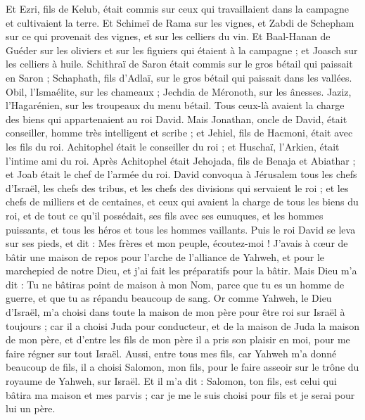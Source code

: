 \begin{multicols}{2}
Et Ezri, fils de Kelub, était commis sur ceux qui travaillaient dans la campagne et cultivaient la terre.
Et Schimeï de Rama sur les vignes, et Zabdi de Schepham sur ce qui provenait des vignes, et sur les celliers du vin.
Et Baal-Hanan de Guéder sur les oliviers et sur les figuiers qui étaient à la campagne ; et Joasch sur les celliers à huile.
Schithraï de Saron était commis sur le gros bétail qui paissait en Saron ; Schaphath, fils d'Adlaï, sur le gros bétail qui paissait dans les vallées.
Obil, l'Ismaélite, sur les chameaux ; Jechdia de Méronoth, sur les ânesses.
Jaziz, l'Hagarénien, sur les troupeaux du menu bétail. Tous ceux-là avaient la charge des biens qui appartenaient au roi David.
Mais Jonathan, oncle de David, était conseiller, homme très intelligent et scribe ; et Jehiel, fils de Hacmoni, était avec les fils du roi.
Achitophel était le conseiller du roi ; et Huschaï, l'Arkien, était l'intime ami du roi.
Après Achitophel était Jehojada, fils de Benaja et Abiathar ; et Joab était le chef de l'armée du roi.
\VerseOne{}David convoqua à Jérusalem tous les chefs d'Israël, les chefs des tribus, et les chefs des divisions qui servaient le roi ; et les chefs de milliers et de centaines, et ceux qui avaient la charge de tous les biens du roi, et de tout ce qu'il possédait, ses fils avec ses eunuques, et les hommes puissants, et tous les héros et tous les hommes vaillants.
Puis le roi David se leva sur ses pieds, et dit : Mes frères et mon peuple, écoutez-moi ! J'avais à cœur de bâtir une maison de repos pour l'arche de l'alliance de Yahweh, et pour le marchepied de notre Dieu, et j'ai fait les préparatifs pour la bâtir.
Mais Dieu m'a dit : Tu ne bâtiras point de maison à mon Nom, parce que tu es un homme de guerre, et que tu as répandu beaucoup de sang.
Or comme Yahweh, le Dieu d'Israël, m'a choisi dans toute la maison de mon père pour être roi sur Israël à toujours ; car il a choisi Juda pour conducteur, et de la maison de Juda la maison de mon père, et d'entre les fils de mon père il a pris son plaisir en moi, pour me faire régner sur tout Israël.
Aussi, entre tous mes fils, car Yahweh m'a donné beaucoup de fils, il a choisi Salomon, mon fils, pour le faire asseoir sur le trône du royaume de Yahweh, sur Israël.
Et il m'a dit : Salomon, ton fils, est celui qui bâtira ma maison et mes parvis ; car je me le suis choisi pour fils et je serai pour lui un père.

\end{multicols}
